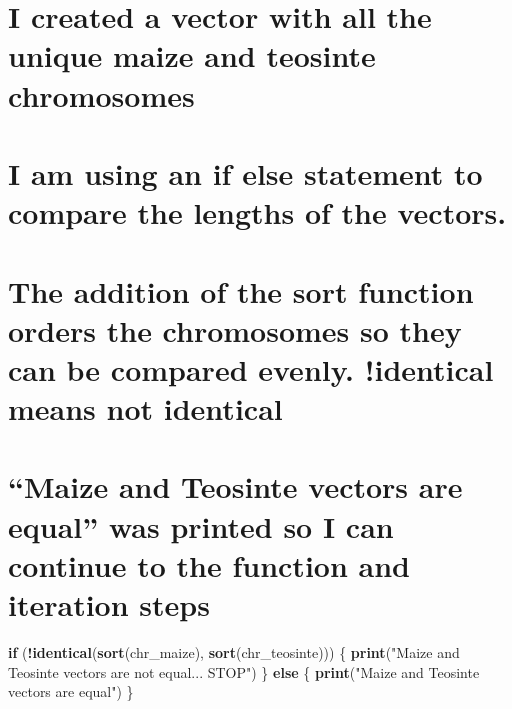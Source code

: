 \documentclass[
]{article}
\newenvironment{Shaded}{\begin{snugshade}}{\end{snugshade}}
\newcommand{\ControlFlowTok}[1]{\textcolor[rgb]{0.13,0.29,0.53}{\textbf{#1}}}
\newcommand{\FunctionTok}[1]{\textcolor[rgb]{0.13,0.29,0.53}{\textbf{#1}}}
\newcommand{\NormalTok}[1]{#1}
\newcommand{\OtherTok}[1]{\textcolor[rgb]{0.56,0.35,0.01}{#1}}
\newcommand{\SpecialCharTok}[1]{\textcolor[rgb]{0.81,0.36,0.00}{\textbf{#1}}}
\newcommand{\StringTok}[1]{\textcolor[rgb]{0.31,0.60,0.02}{#1}}
\begin{document}
\section{I created a vector with all the unique maize and teosinte
chromosomes}\label{i-created-a-vector-with-all-the-unique-maize-and-teosinte-chromosomes}

\begin{Shaded}
\end{Shaded}

\section{I am using an if else statement to compare the lengths of the
vectors.}\label{i-am-using-an-if-else-statement-to-compare-the-lengths-of-the-vectors.}

\section{The addition of the sort function orders the chromosomes so
they can be compared evenly. !identical means not
identical}\label{the-addition-of-the-sort-function-orders-the-chromosomes-so-they-can-be-compared-evenly.-identical-means-not-identical}

\section{``Maize and Teosinte vectors are equal'' was printed so I can
continue to the function and iteration
steps}\label{maize-and-teosinte-vectors-are-equal-was-printed-so-i-can-continue-to-the-function-and-iteration-steps}

\begin{Shaded}
\begin{Highlighting}[]
\ControlFlowTok{if}\NormalTok{ (}\SpecialCharTok{!}\FunctionTok{identical}\NormalTok{(}\FunctionTok{sort}\NormalTok{(chr\_maize), }\FunctionTok{sort}\NormalTok{(chr\_teosinte))) \{}
  \FunctionTok{print}\NormalTok{(}\StringTok{"Maize and Teosinte vectors are not equal... STOP"}\NormalTok{) }
\NormalTok{\} }\ControlFlowTok{else}\NormalTok{ \{}
   \FunctionTok{print}\NormalTok{(}\StringTok{"Maize and Teosinte vectors are equal"}\NormalTok{)}
\NormalTok{  \}}
\end{Highlighting}
\end{Shaded}
\end{document}
